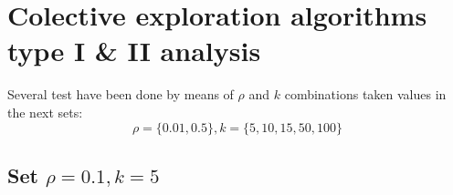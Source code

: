 \newpage
\section{Colective exploration algorithms type I \& II analysis}

Several test have been done by means of $\rho$ and $k$ combinations taken values in the next sets: $$\rho = \{0.01, 0.5\}, k = \{5, 10, 15, 50, 100\}$$

\subsection{Set $\rho = 0.1, k=5$}

\begin{figure}[ht]
\centering
{}
\label{fig:fig1}
\end{figure}


